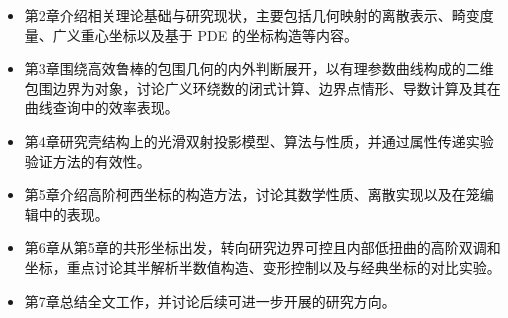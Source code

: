 \begin{itemize}
  \item 第2章介绍相关理论基础与研究现状，主要包括几何映射的离散表示、畸变度量、广义重心坐标以及基于 PDE 的坐标构造等内容。
  \item 第3章围绕高效鲁棒的包围几何的内外判断展开，以有理参数曲线构成的二维包围边界为对象，讨论广义环绕数的闭式计算、边界点情形、导数计算及其在曲线查询中的效率表现。
  \item 第4章研究壳结构上的光滑双射投影模型、算法与性质，并通过属性传递实验验证方法的有效性。
  \item 第5章介绍高阶柯西坐标的构造方法，讨论其数学性质、离散实现以及在笼编辑中的表现。
  \item 第6章从第5章的共形坐标出发，转向研究边界可控且内部低扭曲的高阶双调和坐标，重点讨论其半解析半数值构造、变形控制以及与经典坐标的对比实验。
  \item 第7章总结全文工作，并讨论后续可进一步开展的研究方向。
\end{itemize}






